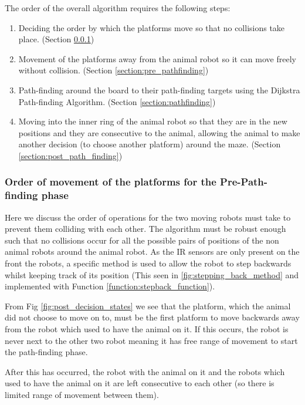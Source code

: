 The order of the overall algorithm requires the following steps:

\begin{tcolorbox}
\begin{enumerate}
    \item Deciding the order by which the platforms move so that no collisions take place. (Section \ref{section:order_of_operations})
    \item Movement of the platforms away from the animal robot so it can move freely without collision. (Section \ref{section:pre_pathfinding})
    \item Path-finding around the board to their path-finding targets using the Dijkstra Path-finding Algorithm. (Section \ref{section:pathfinding})
    \item Moving into the inner ring of the animal robot so that they are in the new positions and they are consecutive to the animal, allowing the animal to make another decision (to choose another platform) around the maze. (Section \ref{section:post_path_finding})
\end{enumerate}
\end{tcolorbox}



\subsubsection{Order of movement of the platforms for the Pre-Path-finding phase}
\label{section:order_of_operations}
Here we discuss the order of operations for the two moving robots must take to prevent them colliding with each other. The algorithm must be robust enough such that no collisions occur for all the possible pairs of positions of the non animal robots around the animal robot. As the IR sensors are only present on the front the robots, a specific method is used to allow the robot to step backwards whilst keeping track of its position (This seen in \ref{fig:stepping_back_method} and implemented with Function \ref{function:stepback_function}).

From Fig \ref{fig:post_decision_states} we see that the platform, which the animal did not choose to move on to, must be the first platform to move backwards away from the robot which used to have the animal on it. If this occurs, the robot is never next to the other two robot meaning it has free range of movement to start the path-finding phase.

After this has occurred, the robot with the animal on it and the robots which used to have the animal on it are left consecutive to each other (so there is limited range of movement between them).

